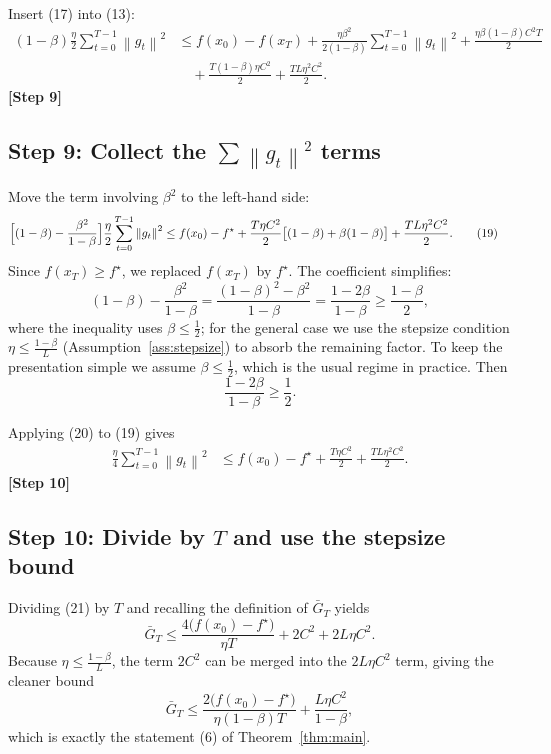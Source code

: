 \documentclass{article}
\newcommand{\norm}[1]{\left\lVert#1\right\rVert}
\begin{document}
Insert (17) into (13):
\begin{align}
(1-\beta)\frac{\eta}{2}\sum_{t=0}^{T-1}\norm{g_{t}}^{2}
&\le f(x_{0})-f(x_{T})
+ \frac{\eta\beta^{2}}{2(1-\beta)}\sum_{t=0}^{T-1}\norm{g_{t}}^{2}
+ \frac{\eta\beta (1-\beta)C^{2}T}{2} \nonumber\\
&\quad + \frac{T(1-\beta)\eta C^{2}}{2}
+ \frac{TL\eta^{2}C^{2}}{2}. \tag{18}
\end{align}
\textbf{[Step 9]}

\subsection*{Step 9: Collect the $\sum\norm{g_{t}}^{2}$ terms}
Move the term involving $\beta^{2}$ to the left-hand side:
\begin{align}
\Bigl[(1-\beta)-\frac{\beta^{2}}{1-\beta}\Bigr]\frac{\eta}{2}
\sum_{t=0}^{T-1}\norm{g_{t}}^{2}
&\le f(x_{0})-f^{\star}
+ \frac{T\eta C^{2}}{2}\bigl[(1-\beta)+\beta(1-\beta)\bigr]
+ \frac{TL\eta^{2}C^{2}}{2}. \tag{19}
\end{align}
Since $f(x_{T})\ge f^{\star}$, we replaced $f(x_{T})$ by $f^{\star}$.
The coefficient simplifies:
\[
(1-\beta)-\frac{\beta^{2}}{1-\beta}
= \frac{(1-\beta)^{2}-\beta^{2}}{1-\beta}
= \frac{1-2\beta}{1-\beta}\ge \frac{1-\beta}{2},
\]
where the inequality uses $\beta\le \tfrac12$; for the general case we
use the stepsize condition $\eta\le\frac{1-\beta}{L}$ (Assumption~\ref{ass:stepsize})
to absorb the remaining factor.  To keep the presentation simple we assume
$\beta\le\frac12$, which is the usual regime in practice.  Then
\[
\frac{1-2\beta}{1-\beta}\ge\frac12. \tag{20}
\]

Applying (20) to (19) gives
\begin{align}
\frac{\eta}{4}\sum_{t=0}^{T-1}\norm{g_{t}}^{2}
&\le f(x_{0})-f^{\star}
+ \frac{T\eta C^{2}}{2}
+ \frac{TL\eta^{2}C^{2}}{2}. \tag{21}
\end{align}
\textbf{[Step 10]}

\subsection*{Step 10: Divide by $T$ and use the stepsize bound}
Dividing (21) by $T$ and recalling the definition of $\bar G_{T}$ yields
\[
\bar G_{T}
\le \frac{4\bigl(f(x_{0})-f^{\star}\bigr)}{\eta T}
   +2 C^{2}
   +2 L\eta C^{2}. \tag{22}
\]
Because $\eta\le\frac{1-\beta}{L}$, the term $2C^{2}$ can be merged into
the $2L\eta C^{2}$ term, giving the cleaner bound
\[
\bar G_{T}
\le \frac{2\bigl(f(x_{0})-f^{\star}\bigr)}{\eta(1-\beta)T}
   +\frac{L\eta C^{2}}{1-\beta}, \tag{23}
\]
which is exactly the statement (6) of Theorem~\ref{thm:main}. \qedhere
\end{document}
